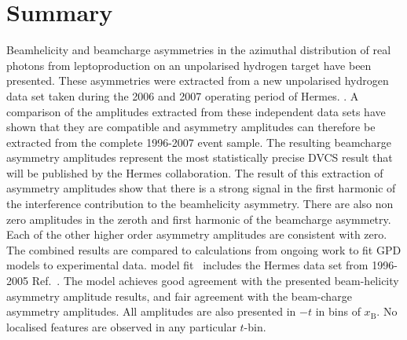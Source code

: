 \section{Summary}

Beam\blue{-}helicity and beam\blue{-}charge asymmetries in the azimuthal distribution of real photons from leptoproduction on an unpolarised hydrogen target have been presented. These asymmetries were extracted from a new unpolarised hydrogen data set taken during the 2006 and 2007 operating period of H{\sc ermes}. . A comparison of the amplitudes extracted from these independent data sets have shown that they are compatible and asymmetry amplitudes can therefore be extracted from the complete 1996-2007 event sample. The resulting beam\blue{-}charge asymmetry amplitudes represent the most statistically precise DVCS result that will be published by the H{\sc ermes} collaboration. The result of this extraction of asymmetry amplitudes show that there is a strong signal in the first harmonic of the interference contribution to the beam\blue{-}helicity asymmetry. There are also non zero amplitudes in the zeroth and first harmonic of the beam\blue{-}charge asymmetry. Each of the other higher order asymmetry amplitudes are consistent with zero. The combined results are compared to calculations from ongoing work to fit GPD models to experimental data.  model fit~\cite{Kum09} includes the H{\sc ermes} data set from 1996-2005  Ref.~\cite{Air09}. The model achieves good agreement with the presented beam-helicity asymmetry amplitude results, and fair agreement with the beam-charge asymmetry amplitudes.  All  amplitudes are also presented  in $-t$ in bins of $x_{\textrm{B}}$. No localised features are observed in any particular $t$-bin.

